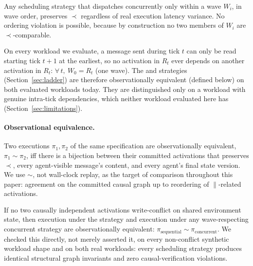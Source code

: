 \begin{proposition}
\label{prop:wave-safety}
Any scheduling strategy that dispatches concurrently only within a wave $W_i$, in wave order, preserves $\prec$ regardless of real execution latency variance. No ordering violation is possible, because by construction no two members of $W_i$ are $\prec$-comparable.
\end{proposition}

\begin{proposition}
\label{prop:single-wave}
On every workload we evaluate, a message sent during tick $t$ can only be read starting tick $t+1$ at the earliest, so no activation in $R_t$ ever depends on another activation in $R_t$: $\forall\, t,\ W_0 = R_t$ (one wave). The \CausalOnly{} and \NaiveConcurrent{} strategies (Section~\ref{sec:ladder}) are therefore observationally equivalent (defined below) on both evaluated workloads today. They are distinguished only on a workload with genuine intra-tick dependencies, which neither workload evaluated here has (Section~\ref{sec:limitations}).
\end{proposition}

\paragraph{Observational equivalence.}
Two executions $\pi_1, \pi_2$ of the same specification are observationally equivalent, $\pi_1 \sim \pi_2$, iff there is a bijection between their committed activations that preserves $\prec$, every agent-visible message's content, and every agent's final state version. We use $\sim$, not wall-clock replay, as the target of comparison throughout this paper: agreement on the committed causal graph up to reordering of $\parallel$-related activations.

\begin{proposition}
\label{prop:no-conflict-equivalence}
If no two causally independent activations write-conflict on shared environment state, then execution under the \Sequential{} strategy and execution under any wave-respecting concurrent strategy are observationally equivalent: $\pi_{\text{sequential}} \sim \pi_{\text{concurrent}}$. We checked this directly, not merely asserted it, on every non-conflict synthetic workload shape and on both real workloads: every scheduling strategy produces identical structural graph invariants and zero causal-verification violations.
\end{proposition}

